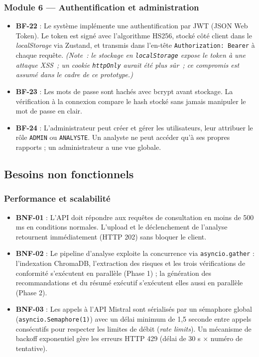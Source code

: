 \documentclass[a4paper,12pt,oneside]{report}
\begin{document}
	\subsubsection*{Module 6 — Authentification et administration}
	
	\begin{itemize}
		\item \textbf{BF-22} : Le système implémente une authentification par
		JWT (JSON Web Token). Le token est signé avec l'algorithme HS256,
		stocké côté client dans le \textit{localStorage} via Zustand, et
		transmis dans l'en-tête \texttt{Authorization: Bearer} à chaque
		requête. \textit{(Note~: le stockage en \texttt{localStorage} expose le token
			à une attaque XSS~; un cookie \texttt{httpOnly} aurait été plus sûr~;
			ce compromis est assumé dans le cadre de ce prototype.)}
		\item \textbf{BF-23} : Les mots de passe sont hachés avec bcrypt avant
		stockage. La vérification à la connexion compare le hash stocké sans
		jamais manipuler le mot de passe en clair.
		\item \textbf{BF-24} : L'administrateur peut créer et gérer les
		utilisateurs, leur attribuer le rôle \texttt{ADMIN} ou
		\texttt{ANALYSTE}. Un analyste ne peut accéder qu'à ses propres
		rapports ; un administrateur a une vue globale.
	\end{itemize}
	
	\subsection{Besoins non fonctionnels}
	
	\subsubsection*{Performance et scalabilité}
	
	\begin{itemize}
		\item \textbf{BNF-01} : L'API doit répondre aux requêtes de consultation
		en moins de 500 ms en conditions normales. L'upload et le déclenchement
		de l'analyse retournent immédiatement (HTTP 202) sans bloquer le
		client.
		\item \textbf{BNF-02} : Le pipeline d'analyse exploite la concurrence
		via \texttt{asyncio.gather} : l'indexation ChromaDB, l'extraction
		des risques et les trois vérifications de conformité s'exécutent en
		parallèle (Phase 1) ; la génération des recommandations et du résumé
		exécutif s'exécutent elles aussi en parallèle (Phase 2).
		\item \textbf{BNF-03} : Les appels à l'API Mistral sont sérialisés par
		un sémaphore global (\texttt{asyncio.Semaphore(1)}) avec un délai
		minimum de 1,5 seconde entre appels consécutifs pour respecter les
		limites de débit (\textit{rate limits}). Un mécanisme de backoff
		exponentiel gère les erreurs HTTP 429 (délai de 30 s × numéro
		de tentative).
	\end{itemize}
	
\end{document}
